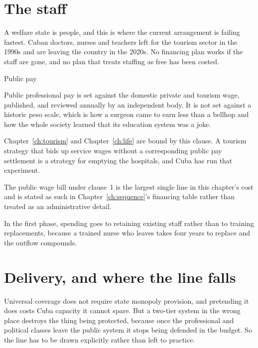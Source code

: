 \section{The staff}

A welfare state is people, and this is where the current arrangement is failing
fastest. Cuban doctors, nurses and teachers left for the tourism sector in the
1990s and are leaving the country in the 2020s. No financing plan works if the
staff are gone, and no plan that treats staffing as free has been costed.

\begin{design}{Public pay}
\label{d:pay}
\begin{rules}
 Public professional pay is set against the domestic private
and tourism wage, published, and reviewed annually by an independent body. It is
not set against a historic peso scale, which is how a surgeon came to earn less
than a bellhop and how the whole society learned that its education system was
a joke.

 Chapter~\ref{ch:tourism} and Chapter~\ref{ch:life} are bound
by this clause. A tourism strategy that bids up service wages without a
corresponding public pay settlement is a strategy for emptying the hospitals,
and Cuba has run that experiment.

 The public wage bill under clause~1 is the largest single line in
this chapter's cost and is stated as such in Chapter~\ref{ch:sequence}'s
financing table rather than treated as an administrative detail.

 In the first phase, spending goes to
retaining existing staff rather than to training replacements, because a
trained nurse who leaves takes four years to replace and the outflow compounds.
\end{rules}
\end{design}

\section{Delivery, and where the line falls}

Universal coverage does not require state monopoly provision, and pretending it
does costs Cuba capacity it cannot spare. But a two-tier system in the wrong
place destroys the thing being protected, because once the professional and
political classes leave the public system it stops being defended in the budget.
So the line has to be drawn explicitly rather than left to practice.

